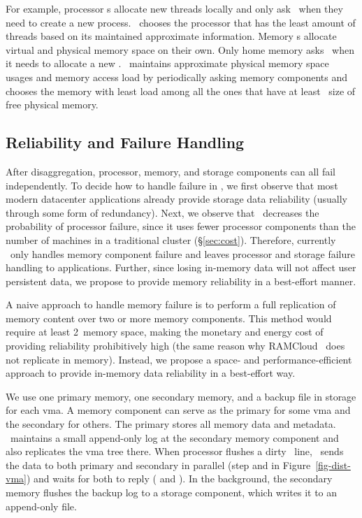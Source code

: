 \documentclass[10pt,times,twocolumn]{z2-article}
\newcommand*\circled[1]{\tikz[baseline=-3pt]{
            \node[shape=circle,draw,inner sep=1pt,minimum size=10pt] (char) {\small #1};}}
\begin{document}
{{{{{{{For example, processor \microos{}s allocate new threads locally 
and only ask \gpm\ when they need to create a new process.
\gpm\ chooses the processor that has the least amount of threads based on its maintained approximate information.
Memory \microos{}s allocate virtual and physical memory space on their own.
Only home memory asks \gmm\ when it needs to allocate a new \vregion.
\gmm\ maintains approximate physical memory space usages and memory access load by periodically asking memory components
and chooses the memory with least load among all the ones that have at least \vregion\ size of free physical memory.


\subsection{Reliability and Failure Handling}
\label{sec:failure}
After disaggregation, processor, memory, and storage components can all fail independently.
To decide how to handle failure in \lego,
we first observe that most modern datacenter applications
already provide storage data reliability (usually through some form of redundancy).
Next, we observe that \lego\ decreases the probability of processor failure,
since it uses fewer processor components than the number of machines in a traditional cluster (\S\ref{sec:cost}).
Therefore, currently \lego\ only handles memory component failure and leaves processor and storage failure handling to applications.
Further, since losing in-memory data will not affect user persistent data,
we propose to provide memory reliability in a best-effort manner.

A naive approach to handle memory failure is to perform a full replication of memory content over two or more memory components.
This method would require at least 2\x\ memory space,
making the monetary and energy cost of providing reliability prohibitively high (the same reason why RAMCloud~\cite{Ongaro11-RamCloud} does not replicate in memory).
Instead, we propose a space- and performance-efficient approach to provide in-memory data reliability in a best-effort way.

We use one primary memory, one secondary memory, and a backup file in storage for each vma.
A memory component can serve as the primary for some vma and the secondary for others.
The primary stores all memory data and metadata. %
\lego\ maintains a small append-only log at the secondary memory component
and also replicates the vma tree there.
When processor flushes a dirty \excache\ line, 
\lego\ sends the data to both primary and secondary in parallel (step \circled{a} and \circled{b} in Figure~\ref{fig-dist-vma})
and waits for both to reply (\circled{c} and \circled{d}).
In the background, the secondary memory flushes the backup log to a storage component,
which writes it to an append-only file.

}}}}}}}
\end{document}
